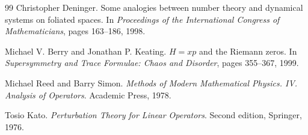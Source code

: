 \documentclass[11pt,a4paper]{article}
\theoremstyle{plain}
\theoremstyle{definition}
\theoremstyle{remark}
\begin{document}
\begin{thebibliography}{99}
Christopher Deninger.
\newblock Some analogies between number theory and dynamical systems on foliated spaces.
\newblock In \emph{Proceedings of the International Congress of Mathematicians}, pages 163--186, 1998.

Michael V. Berry and Jonathan P. Keating.
\newblock $H=xp$ and the Riemann zeros.
\newblock In \emph{Supersymmetry and Trace Formulae: Chaos and Disorder}, pages 355--367, 1999.

Michael Reed and Barry Simon.
\newblock \emph{Methods of Modern Mathematical Physics. IV. Analysis of Operators}.
\newblock Academic Press, 1978.

Tosio Kato.
\newblock \emph{Perturbation Theory for Linear Operators}.
\newblock Second edition, Springer, 1976.

\end{thebibliography}
\end{document}
